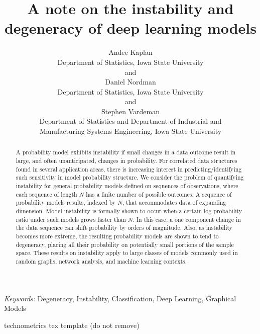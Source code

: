 \documentclass[]{article}
\theoremstyle{definition}
\begin{document}
\def\spacingset#1{\renewcommand{\baselinestretch}%
{#1}\small\normalsize} \spacingset{1}

\title{\bf A note on the instability and degeneracy of deep learning models}
\author{Andee Kaplan \\ Department of Statistics, Iowa State University \\  and \\ Daniel Nordman \\ Department of Statistics, Iowa State University \\  and \\ Stephen Vardeman \\ Department of Statistics and Department of Industrial and\\
Manufacturing Systems Engineering, Iowa State University \\ }

\maketitle
\begin{abstract}
A probability model exhibits instability if small changes in a data
outcome result in large, and often unanticipated, changes in
probability. For correlated data structures found in several application
areas, there is increasing interest in predicting/identifying such
sensitivity in model probability structure. We consider the problem of
quantifying instability for general probability models defined on
sequences of observations, where each sequence of length \(N\) has a
finite number of possible outcomes. A sequence of probability models
results, indexed by \(N\), that accommodates data of expanding
dimension. Model instability is formally shown to occur when a certain
log-probability ratio under such models grows faster than \(N\). In this
case, a one component change in the data sequence can shift probability
by orders of magnitude. Also, as instability becomes more extreme, the
resulting probability models are shown to tend to degeneracy, placing
all their probability on potentially small portions of the sample space.
These results on instability apply to large classes of models commonly
used in random graphs, network analysis, and machine learning contexts.
\end{abstract}
\noindent%
{\it Keywords:}  Degeneracy, Instability, Classification, Deep Learning, Graphical Models
\vfill

\hfill {\tiny technometrics tex template (do not remove)}
\newpage
\spacingset{1.45} %
\end{document}
